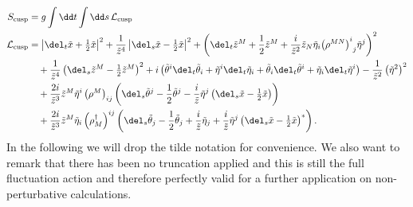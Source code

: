 \begin{align}
S_{\rm cusp} &= g \int \dd t \int \dd s \, \mathcal{L}_{\rm cusp} \label{eq: cusp_action} \\
%
%
\mathcal{L}_{\rm cusp} &= \left\vert \del_{t}\tilde{x} + \tfrac{1}{2}\tilde{x} \right\vert^{2} + \frac{1}{\tilde{z}^{4}}\left\vert \del_{s}\tilde{x} - \tfrac{1}{2}\tilde{x} \right\vert^{2} + \left( \del_{t}\tilde{z}^{M} + \frac{1}{2}\tilde{z}^{M} + \frac{i}{\tilde{z}^{2}}\tilde{z}_{N}\tilde{\eta}_{i} {\left(\rho^{MN}\right)^{i}}_{j} \tilde{\eta}^{j}\right)^{2} \notag \\
%
%
&\quad +\frac{1}{\tilde{z}^{4}}\left( \del_{s}\tilde{z}^{M} - \tfrac{1}{2} \tilde{z}^{M}\right)^{2} + i \left( \tilde{\theta}^{i}\del_{t}\tilde{\theta}_{i} + \tilde{\eta}^{i}\del_{t}\tilde{\eta}_{i} + \tilde{\theta}_{i}\del_{t}\tilde{\theta}^{i} + \tilde{\eta}_{i}\del_{t}\tilde{\eta}^{i}\right) - \frac{1}{\tilde{z}^{2}}\left(\tilde{\eta}^{2}\right)^{2} \notag \\
%
%
&\quad + \frac{2i}{\tilde{z}^{3}}\tilde{z}^{M}\tilde{\eta}^{i} \left(\rho^{M}\right)_{ij} \left( \del_{s}\tilde{\theta}^{j} - \frac{1}{2}\tilde{\theta}^{j} - \frac{i}{\tilde{z}} \tilde{\eta}^{j} \left(\del_{s}\tilde{x}- \tfrac{1}{2}\tilde{x}\right)\right) \notag \\
%
%
&\quad + \frac{2i}{\tilde{z}^{3}}\tilde{z}^{M}\tilde{\eta}_{i}\left(\rho_{M}^{\dagger}\right)^{ij} \left( \del_{s}\tilde{\theta}_{j} - \frac{1}{2} \tilde{\theta}_{j} + \frac{i}{\tilde{z}}\tilde{\eta}_{j} + \frac{i}{\tilde{z}} \tilde{\eta}^{j} \left(\del_{s}\tilde{x}- \tfrac{1}{2}\tilde{x}\right)^{*} \right). \notag
\end{align}
%
%
In the following we will drop the tilde notation for convenience. We also want to remark that there has been no truncation applied and this is still the full fluctuation action and therefore perfectly valid for a further application on non-perturbative calculations.
%
%
%
%
%
%
%
%
%
